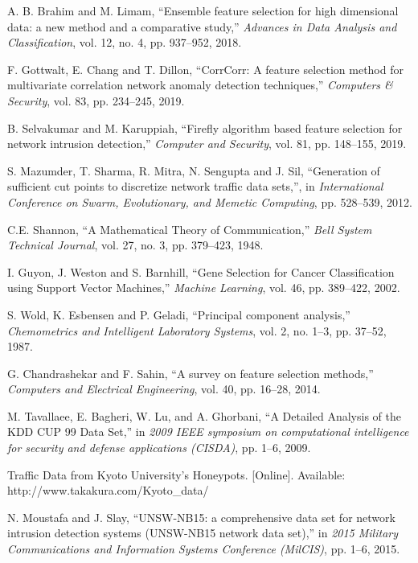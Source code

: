 \documentclass{ieeeaccess}
\theoremstyle{definition}
\begin{document}
\begin{thebibliography}{00}
    A. B. Brahim and M. Limam, ``Ensemble feature selection for high dimensional data: a new method and a comparative study,'' \emph{Advances in Data Analysis and Classification}, vol. 12, no. 4, pp. 937--952, 2018.

    F. Gottwalt, E. Chang and T. Dillon, ``CorrCorr: A feature selection method for multivariate correlation network anomaly detection techniques,'' \emph{Computers \& Security}, vol. 83, pp. 234--245, 2019.

    B. Selvakumar and M. Karuppiah, ``Firefly algorithm based feature selection for network intrusion detection,'' \emph{Computer and Security}, vol. 81, pp. 148--155, 2019.

    S. Mazumder, T. Sharma, R. Mitra, N. Sengupta and J. Sil, ``Generation of sufficient cut points to discretize network traffic data sets,'', in \emph{International Conference on Swarm, Evolutionary, and Memetic Computing}, pp. 528--539, 2012.

    C.E. Shannon, ``A Mathematical Theory of Communication,'' \emph{Bell System Technical Journal}, vol. 27, no. 3, pp. 379--423, 1948.

    I. Guyon, J. Weston and S. Barnhill, ``Gene Selection for Cancer Classification using Support Vector Machines,'' \emph{Machine Learning}, vol. 46, pp. 389--422, 2002.

    S. Wold, K. Esbensen and P. Geladi, ``Principal component analysis,'' \emph{Chemometrics and Intelligent Laboratory Systems}, vol. 2, no. 1--3, pp. 37--52, 1987.

    G. Chandrashekar and F. Sahin, ``A survey on feature selection methods,'' \emph{Computers and Electrical Engineering}, vol. 40, pp. 16--28, 2014.

    M. Tavallaee, E. Bagheri, W. Lu, and A. Ghorbani, ``A Detailed Analysis of the KDD CUP 99 Data Set,'' in \emph{2009 IEEE symposium on computational intelligence for security and defense applications (CISDA)}, pp. 1--6, 2009.

    Traffic Data from Kyoto University's Honeypots. [Online]. Available: \\ http://www.takakura.com/Kyoto\_data/

    N. Moustafa and J. Slay, ``UNSW-NB15: a comprehensive data set for network intrusion detection systems (UNSW-NB15 network data set),'' in \emph{2015 Military Communications and Information Systems Conference (MilCIS)}, pp. 1--6, 2015.


\end{thebibliography}
\end{document}
